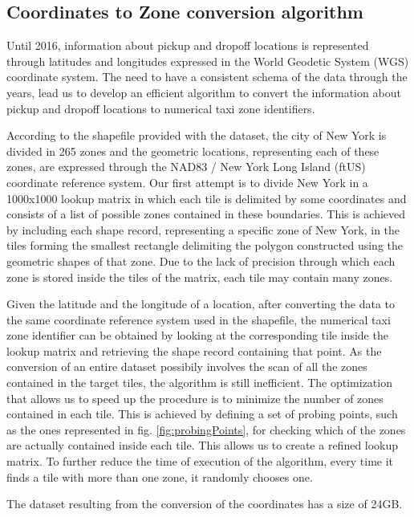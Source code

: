 \documentclass{acm_proc_article-sp-sigmod09}
\begin{document}
\subsection{Coordinates to Zone conversion algorithm}

Until 2016, information about pickup and dropoff locations is represented through latitudes and longitudes expressed in the World Geodetic System (WGS) coordinate system. The need to have a consistent schema of the data through the years, lead us to develop an efficient algorithm to convert the information about pickup and dropoff locations to numerical taxi zone identifiers. 

According to the shapefile provided with the dataset, the city of New York is divided in 265 zones and the geometric locations, representing each of these zones, are expressed through the NAD83 / New York Long Island (ftUS) coordinate reference system. Our first attempt is to divide New York in a 1000x1000 lookup matrix in which each tile is delimited by some coordinates and consists of a list of possible zones contained in these boundaries. This is achieved by including each shape record, representing a specific zone of New York, in the tiles forming the smallest rectangle delimiting the polygon constructed using the geometric shapes of that zone. Due to the lack of precision through which each zone is stored inside the tiles of the matrix, each tile may contain many zones.

Given the latitude and the longitude of a location, after converting the data to the same coordinate reference system used in the shapefile, the numerical taxi zone identifier can be obtained by looking at the corresponding tile inside the lookup matrix and retrieving the shape record containing that point. As the conversion of an entire dataset possibily involves the scan of all the zones contained in the target tiles, the algorithm is still inefficient. The optimization that allows us to speed up the procedure is to minimize the number of zones contained in each tile. This is achieved by defining a set of probing points, such as the ones represented in fig. \ref{fig:probingPoints}, for checking which of the zones are actually contained inside each tile. This allows us to create a refined lookup matrix. To further reduce the time of execution of the algorithm, every time it finds a tile with more than one zone, it randomly chooses one. 

The dataset resulting from the conversion of the coordinates has a size of 24GB.
\end{document}

